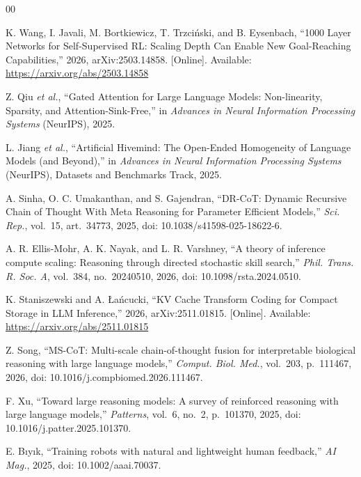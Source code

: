 \documentclass[conference]{IEEEtran}
\begin{document}
\begin{thebibliography}{00}

K. Wang, I. Javali, M. Bortkiewicz, T. Trzci\'{n}ski, and B. Eysenbach, ``1000 Layer Networks for Self-Supervised RL: Scaling Depth Can Enable New Goal-Reaching Capabilities,'' 2026, arXiv:2503.14858. [Online]. Available: \url{https://arxiv.org/abs/2503.14858}

Z. Qiu \emph{et al.}, ``Gated Attention for Large Language Models: Non-linearity, Sparsity, and Attention-Sink-Free,'' in \emph{Advances in Neural Information Processing Systems} (NeurIPS), 2025.

L. Jiang \emph{et al.}, ``Artificial Hivemind: The Open-Ended Homogeneity of Language Models (and Beyond),'' in \emph{Advances in Neural Information Processing Systems} (NeurIPS), Datasets and Benchmarks Track, 2025.

A. Sinha, O. C. Umakanthan, and S. Gajendran, ``DR-CoT: Dynamic Recursive Chain of Thought With Meta Reasoning for Parameter Efficient Models,'' \emph{Sci. Rep.}, vol.~15, art.~34773, 2025, doi: 10.1038/s41598-025-18622-6.

A. R. Ellis-Mohr, A. K. Nayak, and L. R. Varshney, ``A theory of inference compute scaling: Reasoning through directed stochastic skill search,'' \emph{Phil. Trans. R. Soc. A}, vol.~384, no.~20240510, 2026, doi: 10.1098/rsta.2024.0510.

K. Staniszewski and A. {\L}a\'{n}cucki, ``KV Cache Transform Coding for Compact Storage in LLM Inference,'' 2026, arXiv:2511.01815. [Online]. Available: \url{https://arxiv.org/abs/2511.01815}

Z. Song, ``MS-CoT: Multi-scale chain-of-thought fusion for interpretable biological reasoning with large language models,'' \emph{Comput. Biol. Med.}, vol.~203, p.~111467, 2026, doi: 10.1016/j.compbiomed.2026.111467.

F. Xu, ``Toward large reasoning models: A survey of reinforced reasoning with large language models,'' \emph{Patterns}, vol.~6, no.~2, p.~101370, 2025, doi: 10.1016/j.patter.2025.101370.

E. B{\i}y{\i}k, ``Training robots with natural and lightweight human feedback,'' \emph{AI Mag.}, 2025, doi: 10.1002/aaai.70037.

\end{thebibliography}
\end{document}
